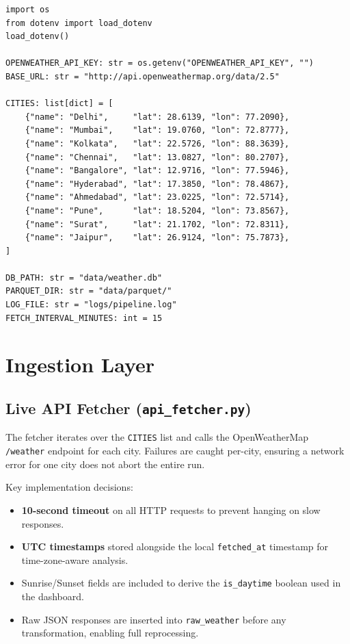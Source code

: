 \documentclass[12pt,a4paper]{report}
\begin{document}
\begin{lstlisting}[style=pythonstyle, caption={config.py -- City and scheduling configuration}]
import os
from dotenv import load_dotenv
load_dotenv()

OPENWEATHER_API_KEY: str = os.getenv("OPENWEATHER_API_KEY", "")
BASE_URL: str = "http://api.openweathermap.org/data/2.5"

CITIES: list[dict] = [
    {"name": "Delhi",     "lat": 28.6139, "lon": 77.2090},
    {"name": "Mumbai",    "lat": 19.0760, "lon": 72.8777},
    {"name": "Kolkata",   "lat": 22.5726, "lon": 88.3639},
    {"name": "Chennai",   "lat": 13.0827, "lon": 80.2707},
    {"name": "Bangalore", "lat": 12.9716, "lon": 77.5946},
    {"name": "Hyderabad", "lat": 17.3850, "lon": 78.4867},
    {"name": "Ahmedabad", "lat": 23.0225, "lon": 72.5714},
    {"name": "Pune",      "lat": 18.5204, "lon": 73.8567},
    {"name": "Surat",     "lat": 21.1702, "lon": 72.8311},
    {"name": "Jaipur",    "lat": 26.9124, "lon": 75.7873},
]

DB_PATH: str = "data/weather.db"
PARQUET_DIR: str = "data/parquet/"
LOG_FILE: str = "logs/pipeline.log"
FETCH_INTERVAL_MINUTES: int = 15
\end{lstlisting}

\section{Ingestion Layer}

\subsection{Live API Fetcher (\texttt{api\_fetcher.py})}

The fetcher iterates over the \texttt{CITIES} list and calls the OpenWeatherMap \texttt{/weather} endpoint for each city. Failures are caught per-city, ensuring a network error for one city does not abort the entire run.

Key implementation decisions:
\begin{itemize}
  \item \textbf{10-second timeout} on all HTTP requests to prevent hanging on slow responses.
  \item \textbf{UTC timestamps} stored alongside the local \texttt{fetched\_at} timestamp for time-zone-aware analysis.
  \item Sunrise/Sunset fields are included to derive the \texttt{is\_daytime} boolean used in the dashboard.
  \item Raw JSON responses are inserted into \texttt{raw\_weather} before any transformation, enabling full reprocessing.
\end{itemize}
\end{document}
